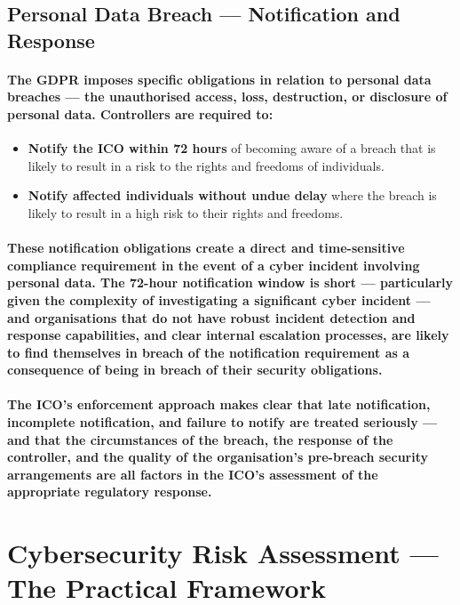 \subsection{Personal Data Breach — Notification and Response}
\paragraph{The GDPR imposes specific obligations in relation to personal data breaches — the unauthorised access, loss, destruction, or disclosure of personal data. Controllers are required to:}
\begin{itemize}
    \item{\textbf{Notify the ICO within 72 hours} of becoming aware of a breach that is likely to result in a risk to the rights and freedoms of individuals.}
    \item{\textbf{Notify affected individuals without undue delay} where the breach is likely to result in a high risk to their rights and freedoms.}
\end{itemize}
\paragraph{These notification obligations create a direct and time-sensitive compliance requirement in the event of a cyber incident involving personal data. The 72-hour notification window is short — particularly given the complexity of investigating a significant cyber incident — and organisations that do not have robust incident detection and response capabilities, and clear internal escalation processes, are likely to find themselves in breach of the notification requirement as a consequence of being in breach of their security obligations.}
\paragraph{The ICO's enforcement approach makes clear that late notification, incomplete notification, and failure to notify are treated seriously — and that the circumstances of the breach, the response of the controller, and the quality of the organisation's pre-breach security arrangements are all factors in the ICO's assessment of the appropriate regulatory response.}

\section{Cybersecurity Risk Assessment — The Practical Framework}
